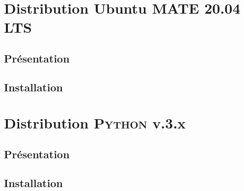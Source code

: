 \label{app:A}


\section[Distribution Ubuntu MATE 20.04 LTS]{Distribution Ubuntu MATE 20.04 LTS}
\label{sec:A.1}

\subsection{Présentation}
\label{sub:A.1.1}

\vspace{2cm}



\subsection{Installation}
\label{sub:A.1.2}


\vspace{2cm}



\section[\texorpdfstring{Distribution \textsc{Python} v.3.x}{Distribution Python v.3.x}]{Distribution \textsc{Python} v.3.x}
\label{sec:A.2}

\subsection{Présentation}
\label{sub:A.2.1}

\vspace{2cm}



\subsection{Installation}
\label{sub:A.2.2}
